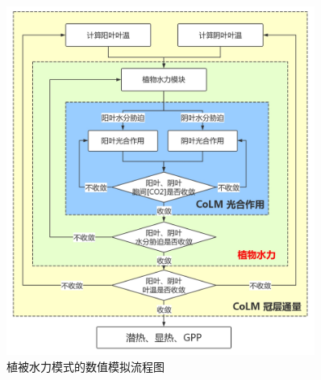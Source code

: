 {
    \begin{figure}[htbp]
    \centering
    \includegraphics[width=0.9\textwidth]{Figures/植被水力模式/植被水力模式的数值模拟流程图.png}
    \caption{植被水力模式的数值模拟流程图}
    \label{fig:植被水力模式的数值模拟流程图}
    \end{figure}
}

